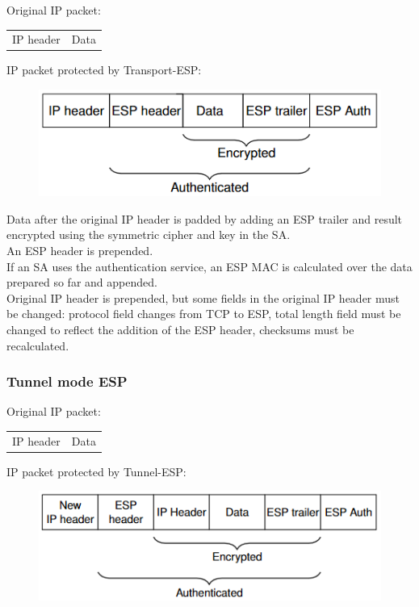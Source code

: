 \documentclass{article}
\begin{document}
Original IP packet:
\begin{center}
\begin{tabular}{ | c | c | }
\hline
IP header & Data
\end{tabular}
\end{center}
IP packet protected by Transport-ESP:
\begin{figure}[H]
\begin{center}
\includegraphics[scale=0.58]{Images/ippackettransportesp.png}
\label{fig:fround}
\end{center}
\end{figure}

Data after the original IP header is padded by adding an ESP trailer and result encrypted using the symmetric cipher and key in the SA.\\
An ESP header is prepended.\\
If an SA uses the authentication service, an ESP MAC is calculated over the data prepared so far and appended.\\
Original IP header is prepended, but some fields in the original IP header must be changed: protocol field changes from TCP to ESP, total length field must be changed to reflect the addition of the ESP header, checksums must be recalculated.

\subsubsection{Tunnel mode ESP}

Original IP packet:
\begin{center}
\begin{tabular}{ | c | c | }
\hline
IP header & Data
\end{tabular}
\end{center}
IP packet protected by Tunnel-ESP:
\begin{figure}[H]
\begin{center}
\includegraphics[scale=0.58]{Images/ippackettunnelesp.png}
\label{fig:fround}
\end{center}
\end{figure}
\end{document}

